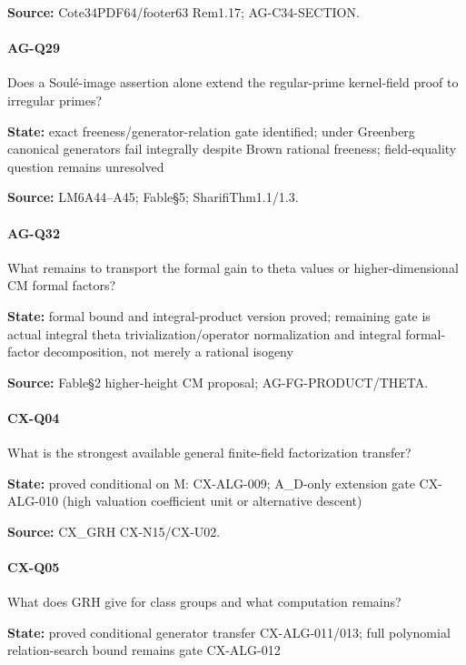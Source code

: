 \documentclass[11pt,a4paper]{article}
\begin{document}
\textbf{Source:} Cote34PDF64/\allowbreak{}footer63 Rem1.\allowbreak{}17; AG-C34-SECTION.

\paragraph{AG-Q29} Does a Soulé-image assertion alone extend the regular-prime kernel-field proof to irregular primes?

\textbf{State:} exact freeness/\allowbreak{}generator-relation gate identified; under Greenberg canonical generators fail integrally despite Brown rational freeness; field-equality question remains unresolved

\textbf{Source:} LM6A44–\allowbreak{}A45; Fable§5; SharifiThm1.\allowbreak{}1/\allowbreak{}1.\allowbreak{}3.

\paragraph{AG-Q32} What remains to transport the formal gain to theta values or higher-dimensional CM formal factors?

\textbf{State:} formal bound and integral-product version proved; remaining gate is actual integral theta trivialization/\allowbreak{}operator normalization and integral formal-factor decomposition, not merely a rational isogeny

\textbf{Source:} Fable§2 higher-height CM proposal; AG-FG-PRODUCT/\allowbreak{}THETA.

\paragraph{CX-Q04} What is the strongest available general finite-field factorization transfer?

\textbf{State:} proved conditional on M:\allowbreak{} CX-ALG-009; A\_\allowbreak{}D-only extension gate CX-ALG-010 (high valuation coefficient unit or alternative descent)

\textbf{Source:} CX\_\allowbreak{}GRH CX-N15/\allowbreak{}CX-U02.

\paragraph{CX-Q05} What does GRH give for class groups and what computation remains?

\textbf{State:} proved conditional generator transfer CX-ALG-011/\allowbreak{}013; full polynomial relation-search bound remains gate CX-ALG-012
\end{document}
